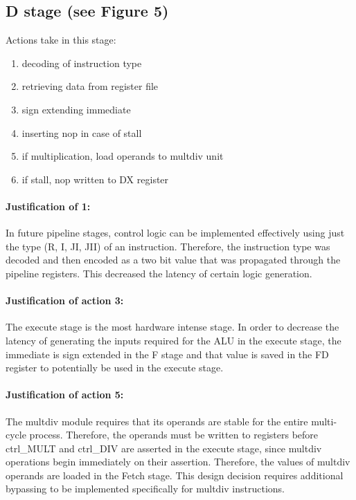 \documentclass[letterpaper]{article}
\begin{document}
\subsection{D stage (see Figure 5)}
Actions take in this stage:
\begin{enumerate}
    \item decoding of instruction type
    \item retrieving data from register file
    \item sign extending immediate 
    \item inserting nop in case of stall
    \item if multiplication, load operands to multdiv unit
    \item if stall, nop written to DX register
\end{enumerate}
\paragraph{Justification of 1:} In future pipeline stages, control logic can be implemented effectively using just the type (R, I, JI, JII) of an instruction. Therefore, the instruction type was decoded and then encoded as a two bit value that was propagated through the pipeline registers. This decreased the latency of certain logic generation.
\paragraph{Justification of action 3:} The execute stage is the most hardware intense stage. In order to decrease the latency of generating the inputs required for the ALU in the execute stage, the immediate is sign extended in the F stage and that value is saved in the FD register to potentially be used in the execute stage. 
\paragraph{Justification of action 5:} The multdiv module requires that its operands are stable for the entire multi-cycle process. Therefore, the operands must be written to registers before ctrl\_MULT and ctrl\_DIV are asserted in the execute stage, since multdiv operations begin immediately on their assertion. Therefore, the values of multdiv operands are loaded in the Fetch stage. This design decision requires additional bypassing to be implemented specifically for multdiv instructions.
\end{document}
